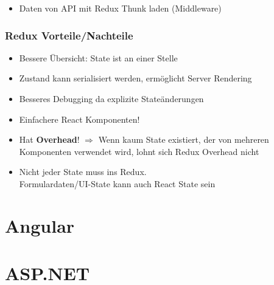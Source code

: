 \begin{multicols*}{4}
\begin{itemize}
    \item Daten von API mit Redux Thunk laden (Middleware)
\end{itemize}

\subsubsection{Redux Vorteile/Nachteile}
\begin{itemize}
    \item Bessere Übersicht: State ist an einer Stelle
    \item Zustand kann serialisiert werden, ermöglicht Server Rendering
    \item Besseres Debugging da explizite Stateänderungen
    \item Einfachere React Komponenten!
    \item Hat \textbf{Overhead}! \(\Rightarrow\) Wenn kaum State existiert, der von mehreren Komponenten verwendet wird, lohnt sich Redux Overhead nicht
    \item Nicht jeder State muss ins Redux.\\Formulardaten/UI-State kann auch React State sein
\end{itemize}

\section{Angular}

\section{ASP.NET}

\end{multicols*}
